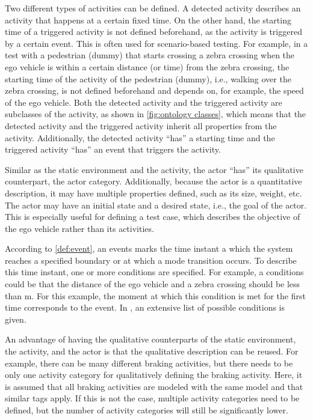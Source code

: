 Two different types of activities can be defined. A detected activity describes an activity that happens at a certain fixed time. On the other hand, the starting time of a triggered activity is not defined beforehand, as the activity is triggered by a certain event. This is often used for scenario-based testing. For example, in a test with a pedestrian (dummy) that starts crossing a zebra crossing when the ego vehicle is within a certain distance (or time) from the zebra crossing, the starting time of the activity of the pedestrian (dummy), i.e., walking over the zebra crossing, is not defined beforehand and depends on, for example, the speed of the ego vehicle. Both the detected activity and the triggered activity are subclasses of the activity, as shown in \cref{fig:ontology classes}, which means that the detected activity and the triggered activity inherit all properties from the activity. Additionally, the detected activity ``has'' a starting time and the triggered activity ``has'' an event that triggers the activity.

Similar as the static environment and the activity, the actor ``has'' its qualitative counterpart, the actor category. Additionally, because the actor is a quantitative description, it may have multiple properties defined, such as its size, weight, etc. The actor may have an initial state and a desired state, i.e., the goal of the actor. This is especially useful for defining a test case, which describes the objective of the ego vehicle rather than its activities.

According to \cref{def:event}, an events marks the time instant a which the system reaches a specified boundary or at which a mode transition occurs. To describe this time instant, one or more conditions are specified. For example, a conditions could be that the distance of the ego vehicle and a zebra crossing should be less than \unit[30]{m}. For this example, the moment at which this condition is met for the first time corresponds to the event. In \cite{openscenario}, an extensive list of possible conditions is given.

An advantage of having the qualitative counterparts of the static environment, the activity, and the actor is that the qualitative description can be reused. For example, there can be many different braking activities, but there needs to be only one activity category for qualitatively defining the braking activity. Here, it is assumed that all braking activities are modeled with the same model and that similar tags apply. If this is not the case, multiple activity categories need to be defined, but the number of activity categories will still be significantly lower.

